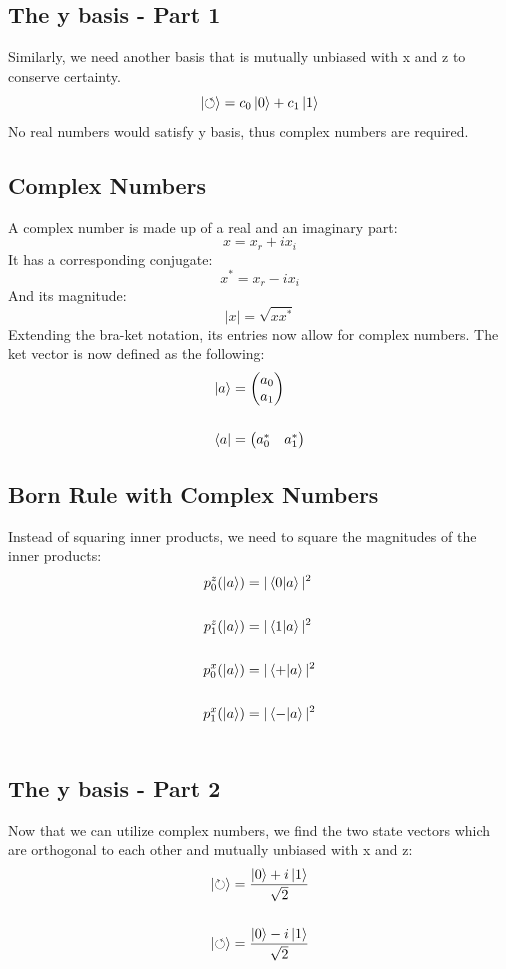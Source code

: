 \documentclass[hidelinks, a4paper, 12pt]{article}
\newcommand{\n}{\\[\baselineskip]}
\begin{document}
        \subsection{The y basis - Part 1}
            Similarly, we need another basis that is mutually unbiased with x and z to conserve certainty.
            \[\ket{\circlearrowleft} = c_0\ket{0} + c_1\ket{1}\]
            No real numbers would satisfy y basis, thus complex numbers are required.

        \subsection{Complex Numbers}
            A complex number is made up of a real and an imaginary part:
            \[x = x_r + ix_i\]
            It has a corresponding conjugate:
            \[x^* = x_r - ix_i\]
            And its magnitude:
            \[|x| = \sqrt{xx^*}\]
            Extending the bra-ket notation, its entries now allow for complex numbers. The ket vector is now defined as the following:
            \[\begin{split}
                \ket{a} &= \begin{pmatrix} a_0 \\ a_1 \end{pmatrix}\n
                \bra{a} &= \begin{pmatrix} a_0^* & a_1^* \end{pmatrix}
            \end{split}\]

        \subsection{Born Rule with Complex Numbers}
            Instead of squaring inner products, we need to square the magnitudes of the inner products:
            \[\begin{split}
                p_0^z(\ket{a}) &= |\braket{0|a}|^2\n
                p_1^z(\ket{a}) &= |\braket{1|a}|^2\n
                p_0^x(\ket{a}) &= |\braket{+|a}|^2\n
                p_1^x(\ket{a}) &= |\braket{-|a}|^2\n
            \end{split}\]

        \subsection{The y basis - Part 2}
            Now that we can utilize complex numbers, we find the two state vectors which are orthogonal to each other and mutually unbiased with x and z:
            \[\begin{split}
                \ket{\circlearrowright} &= \frac{\ket{0} + i\ket{1}}{\sqrt{2}}\n
                \ket{\circlearrowleft} &= \frac{\ket{0} - i\ket{1}}{\sqrt{2}}
            \end{split}\]
\end{document}
